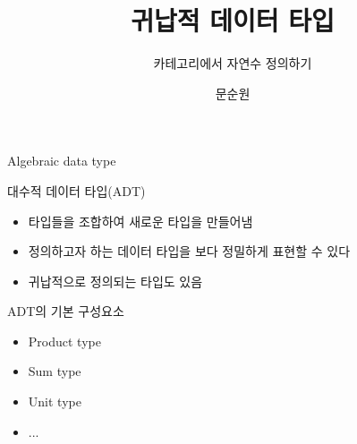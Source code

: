 \documentclass[t]{beamer}
\title{귀납적 데이터 타입}
\subtitle{카테고리에서 자연수 정의하기}
\author{문순원}
\date{}
\begin{document}
\begin{frame}
  \titlepage
\end{frame}

\footnotesize

\begin{frame}{Algebraic data type}
  \begin{block} {대수적 데이터 타입(ADT)}
    \begin{itemize}
      \item 타입들을 조합하여 새로운 타입을 만들어냄
      \item 정의하고자 하는 데이터 타입을 보다 정밀하게 표현할 수 있다
      \item 귀납적으로 정의되는 타입도 있음
    \end{itemize}
  \end{block}

  \pause
  \begin{block}{ADT의 기본 구성요소}
    \begin{itemize}
      \item Product type
      \item Sum type
      \item Unit type
      \item ...
    \end{itemize}
  \end{block}
\end{frame}
\end{document}
